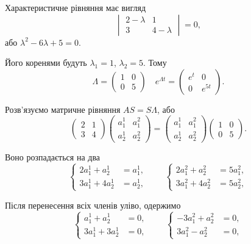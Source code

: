 \begin{solution}
    Характеристичне рівняння має вигляд
    \[ \begin{vmatrix}
        2 - \lambda & 1 \\
        3 & 4 - \lambda 
    \end{vmatrix} = 0, \]
    або $\lambda^2 - 6 \lambda + 5 = 0$. \parvskip
    
    Його коренями будуть $\lambda_1 = 1$, $\lambda_2 = 5$. Тому 
    \[ \Lambda = \begin{pmatrix} 1 & 0 \\ 0 & 5 \end{pmatrix} \quad e^{\Lambda t} = \begin{pmatrix} e^t & 0 \\ 0 & e^{5 t} \end{pmatrix}. \]
    
    Розв'язуємо матричне рівняння $A S = S \Lambda$, або 
    \[ \begin{pmatrix} 2 & 1 \\ 3 & 4 \end{pmatrix} \begin{pmatrix} a_1^1 & a_1^2 \\ a_2^1 & a_2^2 \end{pmatrix} = \begin{pmatrix} a_1^1 & a_1^2 \\ a_2^1 & a_2^2 \end{pmatrix} \begin{pmatrix} 1 & 0 \\ 0 & 5 \end{pmatrix}. \]
    
    Воно розпадається на два 
    \[ \left\{ \begin{aligned} 
        2 a_1^1 + a_2^1 &= a_1^1, \\
        3 a_1^1 + 4 a_2^1 &= a_2^1,
    \end{aligned} \right. 
    \qquad
    \left\{ \begin{aligned} 
        2 a_1^2 + a_2^2 &= 5 a_1^2, \\
        3 a_1^2 + 4 a_2^2 &= 5 a_2^2,
    \end{aligned} \right.\]
    
    Після перенесення всіх членів уліво, одержимо
    \[ \left\{ \begin{aligned} 
        a_1^1 + a_2^1 &= 0, \\
        3  a_1^1 + 3 a_2^1 &= 0,
    \end{aligned} \right. 
    \qquad
    \left\{ \begin{aligned} 
        -3 a_1^2 + a_2^2 &= 0, \\
        3 a_1^2 - a_2^2 &= 0,
    \end{aligned} \right.\]
    

\end{solution}
